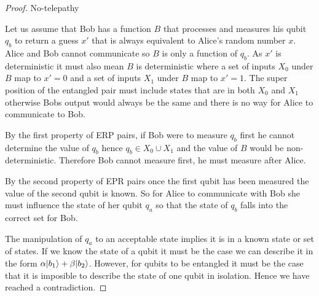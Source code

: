 \begin{proof} No-telepathy


    Let us assume that Bob has a function $B$ that processes and measures his qubit $q_b$ to return a guess $x'$ that is always equivalent to Alice's random number $x$.
Alice and Bob cannot communicate so $B$ is only a function of $q_b$.
As $x'$ is deterministic it must also mean $B$ is deterministic where a set of inputs $X_0$ under $B$ map to $x'=0$ and a set of inputs $X_1$ under $B$ map to $x'=1$.
The super position of the entangled pair must include states that are in both $X_0$ and $X_1$ otherwise Bobs output would always be the same and there is no way for Alice to communicate to Bob.

By the first property of ERP pairs, if Bob were to measure $q_b$ first he cannot determine the value of $q_b$ hence $q_b\in X_0 \cup X_1$ and the value of $B$ would be non-deterministic.
Therefore Bob cannot measure first, he must measure after Alice.


By the second property of EPR pairs once the first qubit has been measured the value of the second qubit is known.
So for Alice to communicate with Bob she must influence the state of her qubit $q_a$ so that the state of $q_b$ falls into the correct set for Bob.

The manipulation of $q_a$ to an acceptable state implies it is in a known state or set of states.
If we know the state of a qubit it must be the case we can describe it in the form $\alpha \lvert b_1\rangle + \beta \lvert b_2\rangle$.
However, for qubits to be entangled it must be the case that it is imposible to describe the state of one qubit in isolation.
Hence we have reached a contradiction.
\end{proof}
